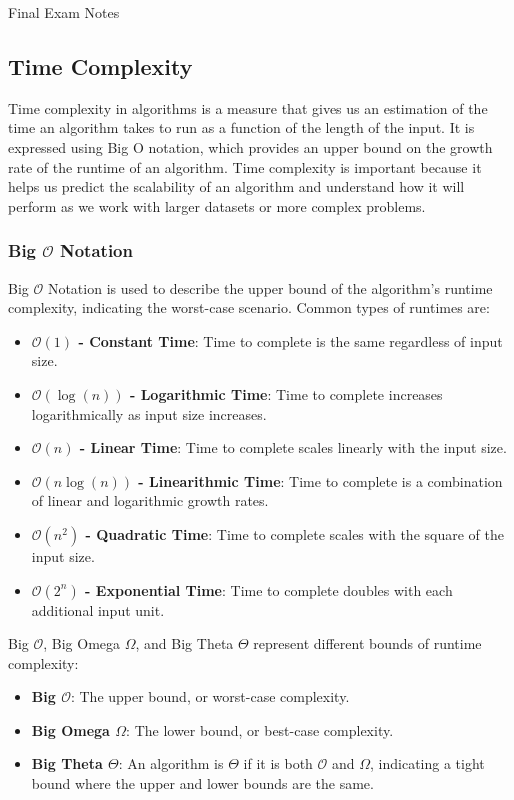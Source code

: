 \begin{examnotes}{Final Exam Notes}
    \subsection*{Time Complexity}

    Time complexity in algorithms is a measure that gives us an estimation of the time an algorithm takes to run as a function of the length of the input. It is expressed using Big O notation, which 
    provides an upper bound on the growth rate of the runtime of an algorithm. Time complexity is important because it helps us predict the scalability of an algorithm and understand how it will 
    perform as we work with larger datasets or more complex problems.

    \subsubsection*{Big $\mathcal{O}$ Notation}

    Big $\mathcal{O}$ Notation is used to describe the upper bound of the algorithm's runtime complexity, indicating the worst-case scenario. Common types of runtimes are:

    \begin{itemize}
        \item \textbf{$\mathcal{O}(1)$ - Constant Time}: Time to complete is the same regardless of input size.
        \item \textbf{$\mathcal{O}(\log{(n)})$ - Logarithmic Time}: Time to complete increases logarithmically as input size increases.
        \item \textbf{$\mathcal{O}(n)$ - Linear Time}: Time to complete scales linearly with the input size.
        \item \textbf{$\mathcal{O}(n\log{(n)})$ - Linearithmic Time}: Time to complete is a combination of linear and logarithmic growth rates.
        \item \textbf{$\mathcal{O}(n^{2})$ - Quadratic Time}: Time to complete scales with the square of the input size.
        \item \textbf{$\mathcal{O}(2^{n})$ - Exponential Time}: Time to complete doubles with each additional input unit.
    \end{itemize}
    Big $\mathcal{O}$, Big Omega $\Omega$, and Big Theta $\Theta$ represent different bounds of runtime complexity:

    \begin{itemize}
        \item \textbf{Big $\mathcal{O}$}: The upper bound, or worst-case complexity.
        \item \textbf{Big Omega $\Omega$}: The lower bound, or best-case complexity.
        \item \textbf{Big Theta $\Theta$}: An algorithm is $\Theta$ if it is both $\mathcal{O}$ and $\Omega$, indicating a tight bound where the upper and lower bounds are the same.
    \end{itemize}


\end{examnotes}
